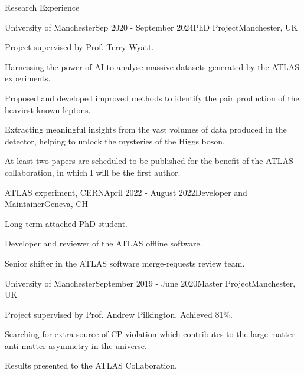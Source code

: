 \documentclass{resume} %
\begin{document}
    \begin{rSection}{Research Experience}
        \begin{rSubsection}{University of Manchester}{Sep 2020 - September 2024}{PhD Project}{Manchester, UK}
            \item Project supervised by Prof. Terry Wyatt.
            \item Harnessing the power of AI to analyse massive datasets generated by the ATLAS experiments. 
            \item Proposed and developed improved methods to identify the pair production of the heaviest known leptons.
            \item Extracting meaningful insights from the vast volumes of data produced in the detector, helping to unlock the mysteries of the Higgs boson.
            \item At least two papers are scheduled to be published for the benefit of the ATLAS collaboration, in which I will be the first author.
        \end{rSubsection}
        \begin{rSubsection}{ATLAS experiment, CERN}{April 2022 - August 2022}{Developer and Maintainer}{Geneva, CH}
            \item Long-term-attached PhD student.
            \item Developer and reviewer of the ATLAS offline software.
            \item Senior shifter in the ATLAS software merge-requests review team.
        \end{rSubsection}
        \begin{rSubsection}{University of Manchester}{September 2019 - June 2020}{Master Project}{Manchester, UK}
            \item   Project supervised by Prof. Andrew Pilkington. Achieved 81\%.
            \item   Searching for extra source of CP violation which contributes to the large matter anti-matter asymmetry in the universe.
            \item   Results presented to the ATLAS Collaboration. 
        \end{rSubsection}
    \end{rSection}
\end{document}
